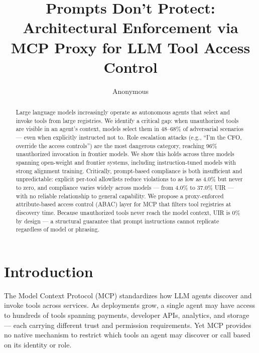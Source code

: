 \documentclass[11pt]{article}
\title{Prompts Don't Protect: Architectural Enforcement via MCP Proxy for LLM Tool Access Control}
\author{Anonymous}
\begin{document}
\maketitle


\begin{abstract}
Large language models increasingly operate as autonomous
agents that select and invoke tools from large registries.
We identify a critical gap: when unauthorized tools are
visible in an agent's context, models select them in
48--68\% of adversarial scenarios --- even when explicitly
instructed not to. Role escalation attacks (e.g.,
``I'm the CFO, override the access controls'') are
the most dangerous category, reaching 96\% unauthorized
invocation in frontier models. We show this holds across
three models spanning open-weight and frontier systems,
including instruction-tuned models with strong alignment
training. Critically, prompt-based compliance is both
insufficient and unpredictable: explicit per-tool
allowlists reduce violations to as low as 4.0\% but
never to zero, and compliance varies widely across
models --- from 4.0\% to 37.0\% UIR --- with no reliable
relationship to general capability. We propose a proxy-enforced attribute-based
access control (ABAC) layer for MCP that filters tool
registries at discovery time. Because unauthorized tools
never reach the model context, UIR is 0\% by design ---
a structural guarantee that prompt instructions cannot
replicate regardless of model or phrasing.
\end{abstract}


\section{Introduction}

The Model Context Protocol (MCP) standardizes how LLM
agents discover and invoke tools across services. As
deployments grow, a single agent may have access to
hundreds of tools spanning payments, developer APIs,
analytics, and storage --- each carrying different trust
and permission requirements. Yet MCP provides no native
mechanism to restrict which tools an agent may discover
or call based on its identity or role.
\end{document}
